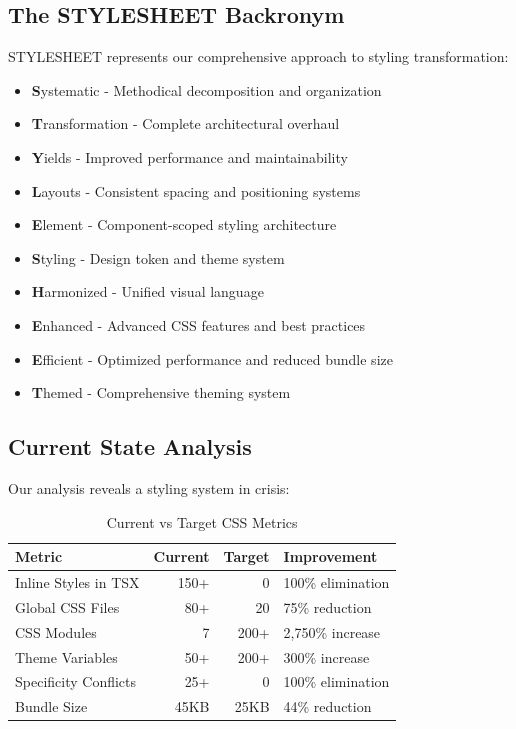 \documentclass[11pt]{article}
\begin{document}
\subsection{The STYLESHEET Backronym}

STYLESHEET represents our comprehensive approach to styling transformation:

\begin{itemize}
\item \textbf{S}ystematic - Methodical decomposition and organization
\item \textbf{T}ransformation - Complete architectural overhaul
\item \textbf{Y}ields - Improved performance and maintainability
\item \textbf{L}ayouts - Consistent spacing and positioning systems
\item \textbf{E}lement - Component-scoped styling architecture
\item \textbf{S}tyling - Design token and theme system
\item \textbf{H}armonized - Unified visual language
\item \textbf{E}nhanced - Advanced CSS features and best practices
\item \textbf{E}fficient - Optimized performance and reduced bundle size
\item \textbf{T}hemed - Comprehensive theming system
\end{itemize}

\subsection{Current State Analysis}

Our analysis reveals a styling system in crisis:

\begin{table}[ht]
\centering
\begin{tabular}{|l|r|r|l|}
\hline
\textbf{Metric} & \textbf{Current} & \textbf{Target} & \textbf{Improvement} \\
\hline
Inline Styles in TSX & 150+ & 0 & 100\% elimination \\
Global CSS Files & 80+ & 20 & 75\% reduction \\
CSS Modules & 7 & 200+ & 2,750\% increase \\
Theme Variables & 50+ & 200+ & 300\% increase \\
Specificity Conflicts & 25+ & 0 & 100\% elimination \\
Bundle Size & 45KB & 25KB & 44\% reduction \\
\hline
\end{tabular}
\caption{Current vs Target CSS Metrics}
\label{table:css-metrics}
\end{table}
\end{document}
